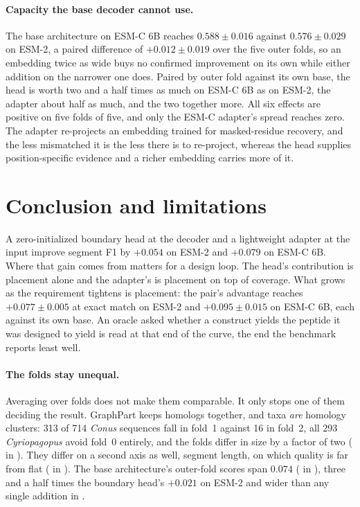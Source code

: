 \documentclass{article}
\begin{document}
\paragraph{Capacity the base decoder cannot use.} The base architecture on ESM-C 6B reaches $0.588\pm0.016$ against $0.576\pm0.029$ on ESM-2, a paired difference of $+0.012\pm0.019$ over the five outer folds, so an embedding twice as wide buys no confirmed improvement on its own while either addition on the narrower one does. Paired by outer fold against its own base, the head is worth two and a half times as much on ESM-C 6B as on ESM-2, the adapter about half as much, and the two together more. All six effects are positive on five folds of five, and only the ESM-C adapter's spread reaches zero. The adapter re-projects an embedding trained for masked-residue recovery, and the less mismatched it is the less there is to re-project, whereas the head supplies position-specific evidence and a richer embedding carries more of it.

\section{Conclusion and limitations}
\label{sec:conclusion}

A zero-initialized boundary head at the decoder and a lightweight adapter at the input improve
segment F1 by $+0.054$ on ESM-2 and $+0.079$ on ESM-C 6B. Where that gain comes from matters for a design loop. The head's contribution is placement alone and the adapter's is
placement on top of coverage. What grows as the requirement tightens is placement: the pair's
advantage reaches $+0.077\pm0.005$ at exact match on ESM-2 and $+0.095\pm0.015$ on ESM-C 6B, each
against its own base. An oracle asked whether a construct yields the peptide it was designed to yield
is read at that end of the curve, the end the benchmark reports least well.

\paragraph{The folds stay unequal.} Averaging over folds does not make them comparable. It only
stops one of them deciding the result. GraphPart keeps homologs together, and taxa \emph{are}
homology clusters: 313 of 714 \emph{Conus} sequences fall in fold~1 against 16 in fold~2, all 293
\emph{Cyriopagopus} avoid fold~0 entirely, and the folds differ in size by a factor of two
( in ). They differ on a second axis as well, segment length,
on which quality is far from flat ( in ). The base
architecture's outer-fold scores span $0.074$ ( in
), three and a half times the boundary head's $+0.021$ on ESM-2 and wider
than any single addition in .
\end{document}
